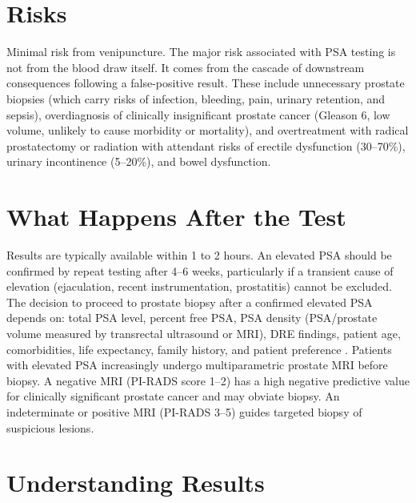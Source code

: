 \section*{Risks}
Minimal risk from venipuncture. The major risk associated with PSA testing is not from the blood draw itself. It comes from the cascade of downstream consequences following a false-positive result. These include unnecessary prostate biopsies (which carry risks of infection, bleeding, pain, urinary retention, and sepsis), overdiagnosis of clinically insignificant prostate cancer (Gleason 6, low volume, unlikely to cause morbidity or mortality), and overtreatment with radical prostatectomy or radiation with attendant risks of erectile dysfunction (30--70\%), urinary incontinence (5--20\%), and bowel dysfunction.

\section*{What Happens After the Test}
Results are typically available within 1 to 2 hours. An elevated PSA should be confirmed by repeat testing after 4--6 weeks, particularly if a transient cause of elevation (ejaculation, recent instrumentation, prostatitis) cannot be excluded. The decision to proceed to prostate biopsy after a confirmed elevated PSA depends on: total PSA level, percent free PSA, PSA density (PSA/prostate volume measured by transrectal ultrasound or MRI), DRE findings, patient age, comorbidities, life expectancy, family history, and patient preference \cite{heidenreich2014eau}. Patients with elevated PSA increasingly undergo multiparametric prostate MRI before biopsy. A negative MRI (PI-RADS score 1--2) has a high negative predictive value for clinically significant prostate cancer and may obviate biopsy. An indeterminate or positive MRI (PI-RADS 3--5) guides targeted biopsy of suspicious lesions.

\section*{Understanding Results}

